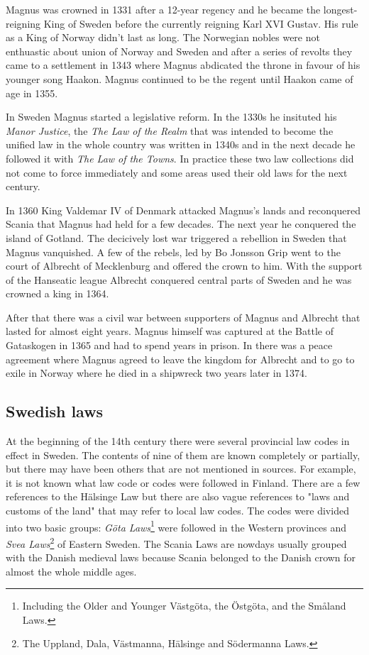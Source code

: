 \documentclass[a4paper]{article}
\begin{document}
Magnus was crowned in 1331 after a 12-year regency and he became the
longest-reigning King of Sweden before the currently reigning Karl XVI
Gustav. His rule as a King of Norway didn't last as long. The
Norwegian nobles were not enthuastic about union of Norway and Sweden
and after a series of revolts they came to a settlement in 1343 where
Magnus abdicated the throne in favour of his younger song Haakon.
Magnus continued to be the regent until Haakon came of age in 1355.

In Sweden Magnus started a legislative reform. In the 1330s he
insituted his \emph{Manor Justice}, the \emph{The Law of the Realm}
that was intended to become the unified law in the whole country was
written in 1340s and in the next decade he followed it with \emph{The
  Law of the Towns}. In practice these two law collections did not
come to force immediately and some areas used their old laws for the
next century.

In 1360 King Valdemar IV of Denmark attacked Magnus's lands and
reconquered Scania that Magnus had held for a few decades. The next
year he conquered the island of Gotland. The decicively lost war
triggered a rebellion in Sweden that Magnus vanquished. A few of the
rebels, led by Bo Jonsson Grip went to the court of Albrecht of
Mecklenburg and offered the crown to him. With the support of the
Hanseatic league Albrecht conquered central parts of Sweden and he was
crowned a king in 1364.

After that there was a civil war between supporters of Magnus and
Albrecht that lasted for almost eight years. Magnus himself was
captured at the Battle of Gataskogen in 1365 and had to spend years in
prison. In there was a peace agreement where Magnus agreed to leave
the kingdom for Albrecht and to go to exile in Norway where he died in
a shipwreck two years later in 1374.


\subsection{Swedish laws}

At the beginning of the 14th century there were several provincial law
codes in effect in Sweden. The contents of nine of them are known
completely or partially, but there may have been others that are not
mentioned in sources. For example, it is not known what law code or
codes were followed in Finland. There are a few references to the
Hälsinge Law but there are also vague references to "laws and customs
of the land" that may refer to local law codes. The codes were divided
into two basic groups: \emph{Göta Laws}\footnote{Including the Older
  and Younger Västgöta, the Östgöta, and the Småland Laws.} were
followed in the Western provinces and \emph{Svea Laws}\footnote{The
  Uppland, Dala, Västmanna, Hälsinge and Södermanna Laws.} of Eastern
Sweden. The Scania Laws are nowdays usually grouped with the Danish
medieval laws because Scania belonged to the Danish crown for almost
the whole middle ages.
\end{document}
